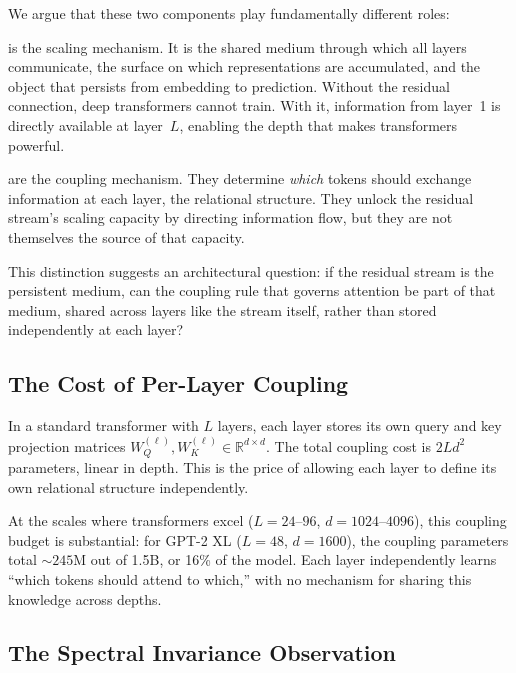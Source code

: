 \documentclass[11pt, a4paper]{article}
\newcommand{\R}{\mathbb{R}}
\theoremstyle{plain}
\theoremstyle{remark}
\begin{document}
We argue that these two components play fundamentally different roles:
\begin{description}[nosep, leftmargin=1.5em]
    \item[The residual stream] is the scaling mechanism.
    It is the shared medium through which all layers communicate, the surface on which representations are accumulated, and the object that persists from embedding to prediction.
    Without the residual connection, deep transformers cannot train.
    With it, information from layer~1 is directly available at layer~$L$, enabling the depth that makes transformers powerful.

    \item[The attention blocks] are the coupling mechanism.
    They determine \emph{which} tokens should exchange information at each layer, the relational structure.
    They unlock the residual stream's scaling capacity by directing information flow, but they are not themselves the source of that capacity.
\end{description}

This distinction suggests an architectural question: if the residual stream is the persistent medium, can the coupling rule that governs attention be part of that medium, shared across layers like the stream itself, rather than stored independently at each layer?

\subsection{The Cost of Per-Layer Coupling}

In a standard transformer with $L$ layers, each layer stores its own query and key projection matrices $W_Q^{(\ell)}, W_K^{(\ell)} \in \R^{d \times d}$.
The total coupling cost is $2Ld^2$ parameters, linear in depth.
This is the price of allowing each layer to define its own relational structure independently.

At the scales where transformers excel ($L = 24$--$96$, $d = 1024$--$4096$), this coupling budget is substantial: for GPT-2 XL ($L{=}48$, $d{=}1600$), the coupling parameters total ${\sim}245$M out of 1.5B, or 16\% of the model.
Each layer independently learns ``which tokens should attend to which,'' with no mechanism for sharing this knowledge across depths.

\subsection{The Spectral Invariance Observation}
\end{document}
